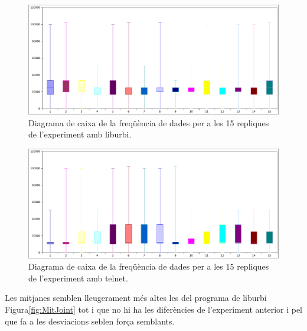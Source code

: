 \documentclass[12pt,a4paper,final,twoside]{article}
\begin{document}
\begin{figure}[h!]
	\centering
    \includegraphics[scale=0.5]{images/JointC++Box.pdf}
	 \caption{Diagrama de caixa de la freqüència de dades per a les 15 repliques de l'experiment amb liburbi.}
  \label{fig:JointsC++Box}
\end{figure} 

\begin{figure}[h!]
	\centering
    \includegraphics[scale=0.5]{images/JointsPythonBox.pdf}
	 \caption{Diagrama de caixa de la freqüència de dades per a les 15 repliques de l'experiment amb telnet.}
  \label{fig:JointsPythonBox}
\end{figure}

Les mitjanes semblen lleugerament més altes les del programa de liburbi Figura\ref{fig:MitJoint} tot i que no hi ha les diferències de l'experiment anterior i pel que fa a les desviacions seblen força semblants.
\end{document}
